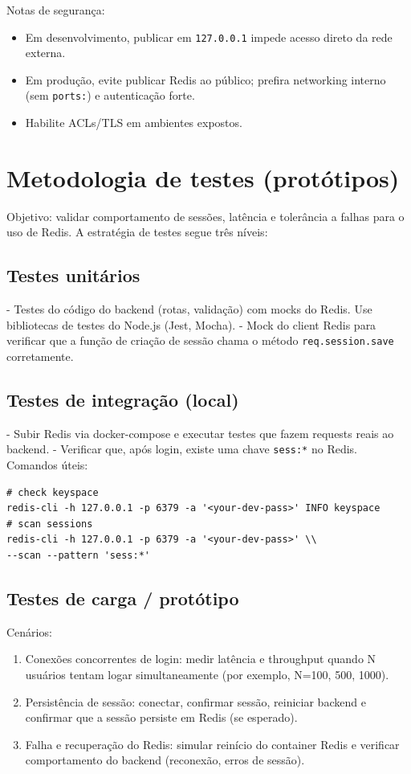 \documentclass[12pt]{article}
\begin{document}
Notas de segurança:
\begin{itemize}
\item Em desenvolvimento, publicar em \texttt{127.0.0.1} impede acesso direto da rede externa.
\item Em produção, evite publicar Redis ao público; prefira networking interno
(sem \texttt{ports:}) e autenticação forte.
\item Habilite ACLs/TLS em ambientes expostos.
\end{itemize}

\section{Metodologia de testes (protótipos)}
Objetivo: validar comportamento de sessões, latência e tolerância a falhas para o uso de Redis. A estratégia de testes segue três níveis:

\subsection{Testes unitários}
- Testes do código do backend (rotas, validação) com mocks do Redis. Use bibliotecas de testes do Node.js (Jest, Mocha).
- Mock do client Redis para verificar que a função de criação de sessão chama o método \texttt{req.session.save} corretamente.

\subsection{Testes de integração (local)}
- Subir Redis via docker-compose e executar testes que fazem requests reais ao backend.
- Verificar que, após login, existe uma chave \texttt{sess:*} no Redis. Comandos úteis:
\begin{verbatim}
# check keyspace
redis-cli -h 127.0.0.1 -p 6379 -a '<your-dev-pass>' INFO keyspace
# scan sessions
redis-cli -h 127.0.0.1 -p 6379 -a '<your-dev-pass>' \\
--scan --pattern 'sess:*'
\end{verbatim}

\subsection{Testes de carga / protótipo}
Cenários:
\begin{enumerate}[label=\arabic*)]
  \item Conexões concorrentes de login: medir latência e throughput quando N usuários tentam logar simultaneamente (por exemplo, N=100, 500, 1000).
  \item Persistência de sessão: conectar, confirmar sessão, reiniciar backend e confirmar que a sessão persiste em Redis (se esperado).
  \item Falha e recuperação do Redis: simular reinício do container Redis e verificar comportamento do backend (reconexão, erros de sessão).
\end{enumerate}
\end{document}
